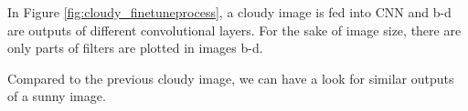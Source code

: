 In Figure \ref{fig:cloudy_finetuneprocess}, a cloudy image is fed into CNN and b-d are outputs of different convolutional layers. For the sake of image size, there are only parts of filters are plotted in images b-d.

Compared to the previous cloudy image, we can have a look for similar outputs of a sunny image.

\begin{figure}[!htb]
    \centering
\end{figure}

